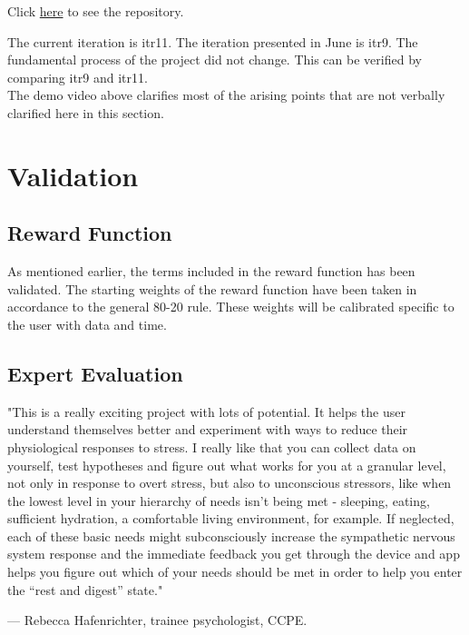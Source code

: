 \documentclass[
	fontsize=15pt,
	twoside=false,
	secnumdepth=2
]{kaobook}
\begin{document}
Click \href{https://github.com/Anaspiringdesigner/Solo-Y}{here} to see the repository.

The current iteration is itr11. The iteration presented in June is itr9. The fundamental process of the project did not change. This can be verified by comparing itr9 and itr11. \\

The demo video above clarifies most of the arising points that are not verbally clarified here in this section. \\

\chapter{Validation}
\section{Reward Function}

As mentioned earlier, the terms included in the reward function has been validated. The starting weights of the reward function have been taken in accordance to the general 80-20 rule. These weights will be calibrated specific to the user with data and time. \\

\section{Expert Evaluation}

\begin{displayquote}
\textcolor{Sepia}{"This is a really exciting project with lots of potential. It helps the user understand themselves better and experiment with ways to reduce their physiological responses to stress. I really like that you can collect data on yourself, test hypotheses and figure out what works for you at a granular level, not only in response to overt stress, but also to unconscious stressors, like when the lowest level in your hierarchy of needs isn't being met - sleeping, eating, sufficient hydration, a comfortable living environment, for example. If neglected, each of these basic needs might subconsciously increase the sympathetic nervous system response and the immediate feedback you get through the device and app helps you figure out which of your needs should be met in order to help you enter the “rest and digest” state."}
\end{displayquote}
\begin{flushright}
--- Rebecca Hafenrichter, trainee psychologist, CCPE.
\end{flushright}
\end{document}
